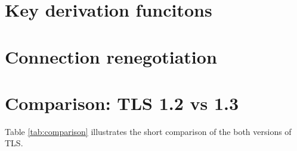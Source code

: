 \section{Key derivation funcitons}
\label{sec:comparison_kdf}

\section{Connection renegotiation}
\label{sec:comparison_renegotiation}

\section{Comparison: TLS 1.2 vs 1.3}
\label{sec:comparison}

Table \ref{tab:comparison} illustrates the short comparison of the both versions of TLS.

